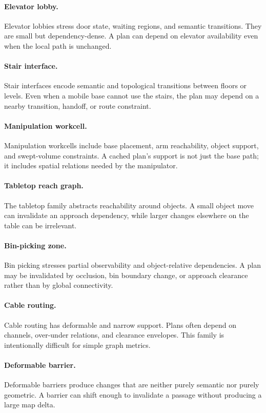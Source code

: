 \documentclass{article}
\begin{document}
\paragraph{Elevator lobby.}
Elevator lobbies stress door state, waiting regions, and semantic transitions. They are small but dependency-dense. A plan can depend on elevator availability even when the local path is unchanged.

\paragraph{Stair interface.}
Stair interfaces encode semantic and topological transitions between floors or levels. Even when a mobile base cannot use the stairs, the plan may depend on a nearby transition, handoff, or route constraint.

\paragraph{Manipulation workcell.}
Manipulation workcells include base placement, arm reachability, object support, and swept-volume constraints. A cached plan's support is not just the base path; it includes spatial relations needed by the manipulator.

\paragraph{Tabletop reach graph.}
The tabletop family abstracts reachability around objects. A small object move can invalidate an approach dependency, while larger changes elsewhere on the table can be irrelevant.

\paragraph{Bin-picking zone.}
Bin picking stresses partial observability and object-relative dependencies. A plan may be invalidated by occlusion, bin boundary change, or approach clearance rather than by global connectivity.

\paragraph{Cable routing.}
Cable routing has deformable and narrow support. Plans often depend on channels, over-under relations, and clearance envelopes. This family is intentionally difficult for simple graph metrics.

\paragraph{Deformable barrier.}
Deformable barriers produce changes that are neither purely semantic nor purely geometric. A barrier can shift enough to invalidate a passage without producing a large map delta.
\end{document}
